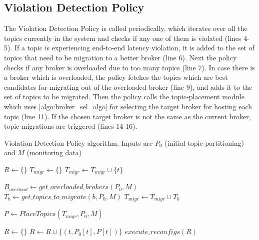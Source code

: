 \subsection{Violation Detection Policy}
The Violation Detection Policy is called periodically, which iterates over all the topics currently in the system and checks if any one of them is violated (lines 4-5). If a topic is experiencing end-to-end latency violation, it is added to the set of topics that need to be migration to a better broker (line 6). Next the policy checks if any broker is overloaded due to too many topics (line 7). In case there is a broker which is overloaded, the policy fetches the topics which are best candidates for migrating out of the overloaded broker (line 9), and adds it to the set of topics to be migrated. Then the policy calls the topic-placement module which uses \cref{algo:broker_sel_algo} for selecting the target broker for hosting each topic (line 11). If the chosen target broker is not the same as the current broker, topic migrations are triggered (lines 14-16).
\begin{algorithm}
\caption{Violation Detection Policy algorithm. Inputs are $P_0$ (initial topic partitioning) and $M$ (monitoring data)}\label{viol_detection_algo}
\begin{algorithmic}[1]
\State $R \gets \{\}$ 
\State $T_{migr} \gets \{\}$ 
        \State $T_{migr} \gets T_{migr} \cup \{ t \}$
    \EndIf
\EndFor

\State $B_{overload} \gets get\_overloaded\_brokers \left( P_0, M \right)$
 
    \State $T_b \gets get\_topics\_to\_migrate\left(b, P_0, M\right)$
    \State $T_{migr} \gets T_{migr} \cup T_b$
\EndFor

\State $P \gets PlaceTopics \left( T_{migr}, P_0, M \right)$ 

\State $R \gets \{\}$ 
        \State $R \gets R \cup \{ \left( t, P_0 \left[ t \right], P \left[ t \right]\right) \}$
    \EndIf
\EndFor
\State $execute\_reconfigs \left( R \right)$ 
\EndProcedure
\end{algorithmic}
\end{algorithm}

